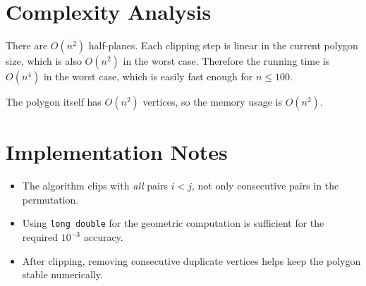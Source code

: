 \documentclass[11pt]{article}
\begin{document}
\section*{Complexity Analysis}

There are $O(n^2)$ half-planes.
Each clipping step is linear in the current polygon size, which is also $O(n^2)$ in the worst case.
Therefore the running time is $O(n^4)$ in the worst case, which is easily fast enough for $n \le 100$.

The polygon itself has $O(n^2)$ vertices, so the memory usage is $O(n^2)$.

\section*{Implementation Notes}

\begin{itemize}[leftmargin=*]
    \item The algorithm clips with \emph{all} pairs $i < j$, not only consecutive pairs in the permutation.
    \item Using \texttt{long double} for the geometric computation is sufficient for the required $10^{-3}$ accuracy.
    \item After clipping, removing consecutive duplicate vertices helps keep the polygon stable numerically.
\end{itemize}
\end{document}
